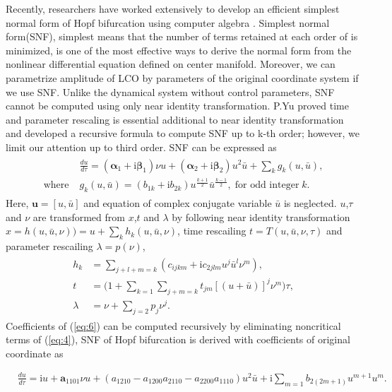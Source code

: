 \documentclass[openacc]{rsproca_new}%
\def\vec#1{\ensuremath{\mathbf{#1}}}
\newcommand{\Eref}[1]{(\ref{#1})}
\begin{document}
Recently, researchers have worked extensively to develop an efficient simplest normal form of Hopf bifurcation using computer algebra \cite{algaba1998hypernormal,yu1998computation}. Simplest normal form(SNF), simplest means that the number of terms retained at each order of is minimized, is one of the most effective ways to derive the normal form from the nonlinear differential equation defined on center manifold. Moreover, we can parametrize amplitude of LCO by parameters of the original coordinate system if we use SNF. Unlike the dynamical system without control parameters, SNF cannot be computed using only near identity transformation. P.Yu \cite{yu2002simplest} proved time and parameter rescaling is essential additional to near identity transformation and developed a recursive formula to compute SNF up to k-th order; however, we limit our attention up to third order. SNF can be expressed as
\begin{align}\label{eq:5}
  \begin{split}
    &\frac{du}{d\tau}=(\vec{\alpha}_1+\textrm{i}\vec{\beta}_1)\nu u+(\vec{\alpha}_2+\textrm{i}\vec{\beta}_2) u^2 \bar{u}+\sum_k g_k(u,\bar{u}),\\
    \textrm{where} \;  &g_k(u,\bar{u})=(b_{1k}+\textrm{i}b_{2k})u^{\frac{k+1}{2}}\bar{u}^{\frac{k-1}{2}}, \; \textrm{for odd integer} \;k.
  \end{split}
\end{align}
Here, \(\vec{u}=[u,\bar{u}]\) and equation of complex conjugate variable \(\bar{u}\) is neglected. \(u\),\(\tau\) and \(\nu\) are transformed from \(x\),\(t\) and \(\lambda\) by following near identity transformation
\(x=h(u,\bar{u},\nu))=u+\sum_k h_k(u,\bar{u},\nu)\), time rescailing \(t=T(u,\bar{u},\nu,\tau)\) and parameter rescailing \(\lambda=p(\nu)\),
\begin{align}\label{eq:6}
  \begin{split}
    h_k &=\sum_{j+l+m=k}(c_{ijkm}+\textrm{i}c_{2jlm}u^j\bar{u}^l \nu^m),\\
    t &=\Big(1+\sum_{k=1}\sum_{j+m=k}t_{jm}[(u+\bar{u})]^j\nu^m\Big)\tau,\\
    \lambda &=\nu+\sum_{j=2}p_j \nu^j.
  \end{split}
\end{align}
Coefficients of \Eref{eq:6} can be computed recursively \cite{yu2002simplest} by eliminating noncritical terms of \Eref{eq:4}, SNF of Hopf bifurcation is derived with coefficients of original coordinate as

\begin{align}\label{eq:9}
&\frac{du}{d\tau}=\textrm{i}u+\vec{a}_{1101}\nu u+(a_{1210}-a_{1200}a_{2110}-a_{2200}a_{1110})u^2\bar u+\textrm{i}\sum_{m=1}b_{2(2m+1)}u^{m+1}u^m.
\end{align}
\end{document}
